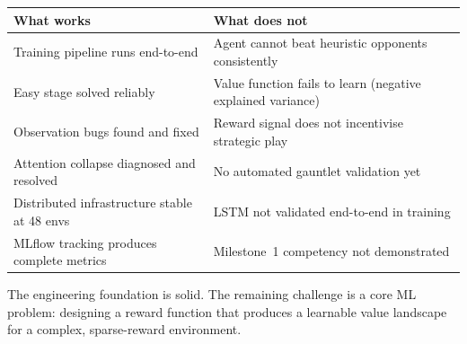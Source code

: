 \begin{center}
\small
\begin{tabularx}{\textwidth}{l X}
  \toprule
  \textbf{What works} & \textbf{What does not} \\
  \midrule
  Training pipeline runs end-to-end &
    Agent cannot beat heuristic opponents consistently \\
  Easy stage solved reliably &
    Value function fails to learn (negative explained variance) \\
  Observation bugs found and fixed &
    Reward signal does not incentivise strategic play \\
  Attention collapse diagnosed and resolved &
    No automated gauntlet validation yet \\
  Distributed infrastructure stable at 48 envs &
    LSTM not validated end-to-end in training \\
  MLflow tracking produces complete metrics &
    Milestone~1 competency not demonstrated \\
  \bottomrule
\end{tabularx}
\end{center}

The engineering foundation is solid.  The remaining challenge is a core ML
problem: designing a reward function that produces a learnable value landscape
for a complex, sparse-reward environment.
